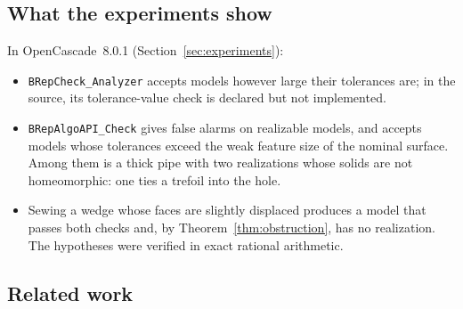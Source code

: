 \documentclass[preprint,12pt]{elsarticle}
\theoremstyle{definition}
\theoremstyle{remark}
\begin{document}
\subsection{What the experiments show}
In OpenCascade~8.0.1 (Section~\ref{sec:experiments}):
\begin{itemize}
\item \texttt{BRepCheck\_Analyzer} accepts models however large their tolerances are; in the source, its
tolerance-value check is declared but not implemented.
\item \texttt{BRepAlgoAPI\_Check} gives false alarms on realizable models, and accepts models whose tolerances
exceed the weak feature size of the nominal surface. Among them is a thick pipe with two realizations whose solids
are not homeomorphic: one ties a trefoil into the hole.
\item Sewing a wedge whose faces are slightly displaced produces a model that passes both checks and, by
Theorem~\ref{thm:obstruction}, has no realization. The hypotheses were verified in exact rational arithmetic.
\end{itemize}

\subsection{Related work}
\end{document}
